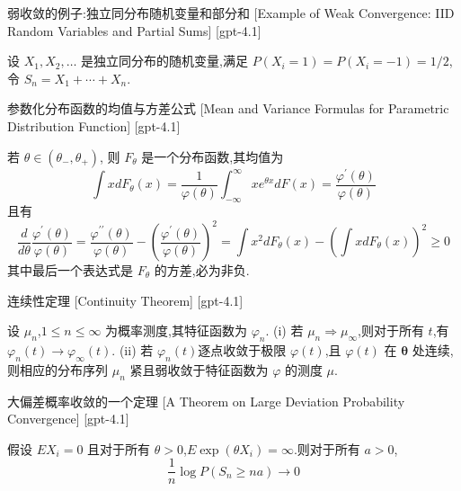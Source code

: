 \documentclass[UTF8]{ctexart}
\begin{document}
    
    
    \begin{xmp}
        {弱收敛的例子:独立同分布随机变量和部分和}
        [Example of Weak Convergence: IID Random Variables and Partial Sums]
        [gpt-4.1]
        
设 $X_{1}, X_{2}, \dots$ 是独立同分布的随机变量,满足 $P(X_{i} = 1) = P(X_{i} = -1) = 1/2$,令 $S_{n} = X_{1} + \cdots + X_{n}$.

    \end{xmp}
    
    
    
    \begin{ppt}
        {参数化分布函数的均值与方差公式}
        [Mean and Variance Formulas for Parametric Distribution Function]
        [gpt-4.1]
        
若 $\theta \in ( \theta_{ - }, \theta_{ + } )$, 则 $F_{ \theta }$ 是一个分布函数,其均值为
\[
\int x dF_{ \theta }( x ) = \frac{ 1 }{ \varphi( \theta ) } \int_{ - \infty }^{ \infty } x e^{ \theta x } dF( x ) = \frac{ \varphi^{ \prime }( \theta ) }{ \varphi( \theta ) }
\]
且有
\[
\frac{ d }{ d \theta } \frac{ \varphi^{ \prime }( \theta ) }{ \varphi( \theta ) } = \frac{ \varphi^{ \prime \prime }( \theta ) }{ \varphi( \theta ) } - \left( \frac{ \varphi^{ \prime }( \theta ) }{ \varphi( \theta ) } \right)^{ 2 } = \int x^{ 2 } dF_{ \theta }( x ) - \left( \int x dF_{ \theta }( x ) \right)^{ 2 } \geq 0
\]
其中最后一个表达式是 $F_{ \theta }$ 的方差,必为非负.

    \end{ppt}
    
    
    
    \begin{thm}
        {连续性定理}
        [Continuity Theorem]
        [gpt-4.1]
        
设 $\mu_n$,$1 \leq n \leq \infty$ 为概率测度,其特征函数为 $\varphi_n$.
(i) 若 $\mu_n \Rightarrow \mu_\infty$,则对于所有 $t$,有 $\varphi_n(t) \to \varphi_\infty(t)$.
(ii) 若 $\varphi_n(t)$逐点收敛于极限 $\varphi(t)$,且 $\varphi(t)$ 在 $\boldsymbol{\theta}$ 处连续,则相应的分布序列 $\mu_n$ 紧且弱收敛于特征函数为 $\varphi$ 的测度 $\mu$.

    \end{thm}
    
    
    
    \begin{thm}
        {大偏差概率收敛的一个定理}
        [A Theorem on Large Deviation Probability Convergence]
        [gpt-4.1]
        
假设 $E X_{i} = 0$ 且对于所有 $\theta > 0$,$E \exp(\theta X_{i}) = \infty$.则对于所有 $a > 0$,
\[
\frac{1}{n} \log P(S_{n} \geq n a) \to 0
\]

    \end{thm}
    
\end{document}
